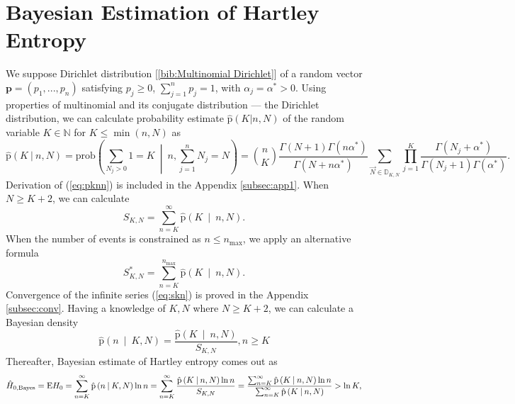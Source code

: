 \section {Bayesian Estimation of Hartley Entropy}
We suppose Dirichlet distribution [\ref{bib:Multinomial Dirichlet}] of a random vector $\mathbf{p} = (p_{1},...,p_{n})$ satisfying  $p_{j} \ge 0$, $\sum_{j=1}^{n} p_{j} = 1$, with $\alpha_j = \alpha^{*} > 0$. Using properties of multinomial and its conjugate distribution --- the Dirichlet distribution, we can calculate probability estimate $\mathrm{\hat{p}}(K|n,N)$ of the random variable $K \in \mathbb{N}$ for $K \le \min(n,N)$ as 
\begin{equation} 
\label{eq:pknn}
\mathrm{\hat{p}}(K \: | \: n,N) = \text{prob}\left(\sum_{N_{j} > 0}{1}=K \: \middle| \: n,\sum_{j=1}^{n}{N_{j}}=N\right) = {n \choose K} \frac{\Gamma({N+1}) \Gamma(n\alpha^{*})}{\Gamma(N+n\alpha^{*})} \sum_{\vec{N} \in \mathbb{D}_{K,N}} \prod_{j=1}^{K} \frac{ \Gamma(N_{j} + \alpha^{*})}{ \Gamma(N_j+1) \Gamma(\alpha^{*})}.
\end{equation}
Derivation of (\ref{eq:pknn}) is included in the Appendix \ref{subsec:app1}. When $N \ge K+2$, we can calculate 
\begin{equation} 
\label{eq:skn}
S_{K,N} = \sum_{n=K}^{\infty}{\mathrm{\hat{p}}\left(K \: \middle| \: n,N\right)}.
\end{equation}
When the number of events is constrained as $n \leq n_{\text{max}} $, we apply an alternative formula
\begin{equation} 
\label{eq:sknalt}
S_{K,N}^{*} = \sum_{n=K}^{n_{\text{max}}}{\mathrm{\hat{p}}\left(K \: \middle| \: n,N\right)}.
\end{equation}
Convergence of the infinite series (\ref{eq:skn}) is proved in the Appendix \ref{subsec:conv}. Having a knowledge of $K,N$ where $N \ge K+2$, we can calculate a Bayesian density
\begin{equation} 
\label{eq:pnkn}
\mathrm{\hat{p}}\left(n \: \middle| \: K,N \right) = \frac{\mathrm{\hat{p}}\left(K \: \middle| \: n,N\right)}{S_{K,N}}, n \ge K
\end{equation}
Thereafter, Bayesian estimate of Hartley entropy comes out as
\begin{equation} 
\label{eq:hnbayes}
\hat{H}_{0,\mbox{\scriptsize{Bayes}}} = \text{E}H_{0}  = \sum_{n=K}^{\infty}{\mathrm{\hat{p}}\left(n \: \middle| \: K,N\right)\ln{n}} = \sum_{n=K}^{\infty} \frac{\mathrm{\hat{p}}\left(K \: \middle| \: n,N\right)\ln{n}}{S_{K,N}} =  \frac{ \sum_{n=K}^{\infty} \mathrm{\hat{p}}\left(K \: \middle| \: n,N\right)\ln{n}}{\sum_{n=K}^{\infty} \mathrm{\hat{p}}\left(K \: \middle| \: n,N\right)} > \ln{K},
\end{equation}
